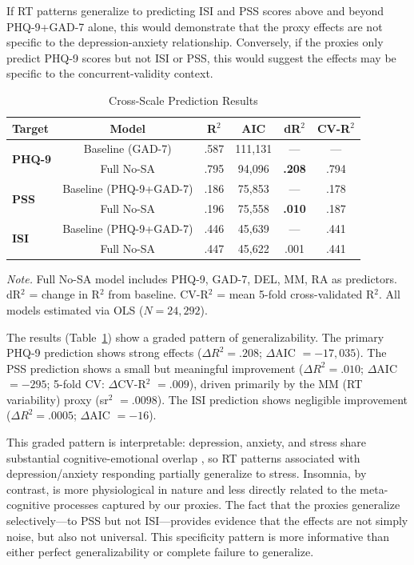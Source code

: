 \documentclass[10pt,twocolumn]{article}
\begin{document}
If RT patterns generalize to predicting ISI and PSS scores above and beyond PHQ-9+GAD-7 alone, this would demonstrate that the proxy effects are not specific to the depression-anxiety relationship. Conversely, if the proxies only predict PHQ-9 scores but not ISI or PSS, this would suggest the effects may be specific to the concurrent-validity context.

\begin{table}[h]
\centering
\caption{Cross-Scale Prediction Results}
\label{tab:cross_scale}
\footnotesize
\begin{tabular}{@{}lccccc@{}}
\toprule
\textbf{Target} & \textbf{Model} & \textbf{R$^2$} & \textbf{AIC} & \textbf{dR$^2$} & \textbf{CV-R$^2$} \\
\midrule
\multirow{2}{*}{\textbf{PHQ-9}} 
  & Baseline (GAD-7) & .587 & 111,131 & --- & --- \\
  & Full No-SA & .795 & 94,096 & \textbf{.208} & .794 \\
\midrule
\multirow{2}{*}{\textbf{PSS}} 
  & Baseline (PHQ-9+GAD-7) & .186 & 75,853 & --- & .178 \\
  & Full No-SA & .196 & 75,558 & \textbf{.010} & .187 \\
\midrule
\multirow{2}{*}{\textbf{ISI}} 
  & Baseline (PHQ-9+GAD-7) & .446 & 45,639 & --- & .441 \\
  & Full No-SA & .447 & 45,622 & .001 & .441 \\
\bottomrule
\end{tabular}
\smallskip
\footnotesize \textit{Note.} Full No-SA model includes PHQ-9, GAD-7, DEL, MM, RA as predictors. dR$^2$ = change in R$^2$ from baseline. CV-R$^2$ = mean 5-fold cross-validated R$^2$. All models estimated via OLS ($N = 24{,}292$).
\end{table}

The results (Table~\ref{tab:cross_scale}) show a graded pattern of generalizability. The primary PHQ-9 prediction shows strong effects ($\Delta R^2 = .208$; $\Delta$AIC $= -17{,}035$). The PSS prediction shows a small but meaningful improvement ($\Delta R^2 = .010$; $\Delta$AIC $= -295$; 5-fold CV: $\Delta$CV-R$^2$ $= .009$), driven primarily by the MM (RT variability) proxy (sr$^2$ $= .0098$). The ISI prediction shows negligible improvement ($\Delta R^2 = .0005$; $\Delta$AIC $= -16$).

This graded pattern is interpretable: depression, anxiety, and stress share substantial cognitive-emotional overlap \citep{Clark1991}, so RT patterns associated with depression/anxiety responding partially generalize to stress. Insomnia, by contrast, is more physiological in nature and less directly related to the meta-cognitive processes captured by our proxies. The fact that the proxies generalize selectively---to PSS but not ISI---provides evidence that the effects are not simply noise, but also not universal. This specificity pattern is more informative than either perfect generalizability or complete failure to generalize.




\end{document}
